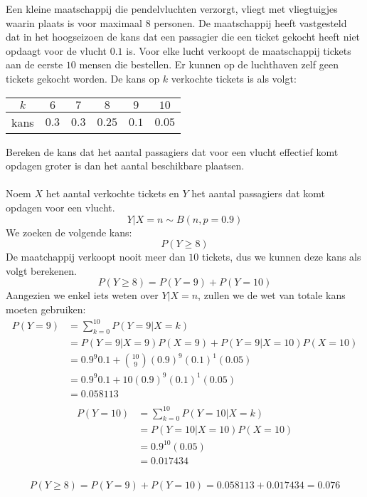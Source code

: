\documentclass[main.tex]{subfiles}
\begin{document}
\begin{oef}
  Een kleine maatschappij die pendelvluchten verzorgt, vliegt met vliegtuigjes waarin plaats is voor maximaal $8$ personen.
  De maatschappij heeft vastgesteld dat in het hoogseizoen de kans dat een passagier die een ticket gekocht heeft niet opdaagt voor de vlucht $0.1$ is.
  Voor elke lucht verkoopt de maatschappij tickets aan de eerste $10$ mensen die bestellen.
  Er kunnen op de luchthaven zelf geen tickets gekocht worden.
  De kans op $k$ verkochte tickets is als volgt:
  \begin{center}
    \begin{tabular}[H]{c|ccccc}
      $k$ & $6$ & $7$ & $8$ & $9$ & $10$\\
      \hline
      kans & $0.3$ & $0.3$ & $0.25$ & $0.1$ & $0.05$\\
    \end{tabular}
  \end{center}
  Bereken de kans dat het aantal passagiers dat voor een vlucht effectief komt opdagen groter is
dan het aantal beschikbare plaatsen.\\\\
  Noem $X$ het aantal verkochte tickets en $Y$ het aantal passagiers dat komt opdagen voor een vlucht.
  \[ Y|X=n \sim B(n,p=0.9) \]
  We zoeken de volgende kans:
  \[ P( Y \ge 8) \]
  De maatchappij verkoopt nooit meer dan $10$ tickets, dus we kunnen deze kans als volgt berekenen. 
  \[ P(Y \ge 8) = P(Y=9) + P(Y=10) \]
  Aangezien we enkel iets weten over $Y|X=n$, zullen we de wet van totale kans moeten gebruiken:
  \[
  \begin{array}{rl}
    P(Y = 9)
    &= \sum_{k=0}^{10}P(Y=9|X=k)\\
    &= P(Y=9|X=9)P(X=9) + P(Y=9|X=10)P(X=10)\\
    &= 0.9^{9}0.1 + \binom{10}{9}(0.9)^{9}(0.1)^{1}(0.05)\\
    &= 0.9^{9}0.1 + 10(0.9)^{9}(0.1)^{1}(0.05)\\
    &= 0.058113\\
  \end{array}
  \]
  \[
  \begin{array}{rl}
    P(Y = 10)
    &= \sum_{k=0}^{10}P(Y=10|X=k)\\
    &= P(Y=10|X=10)P(X=10)\\
    &= 0.9^{10}(0.05)\\
    &= 0.017434\\
  \end{array}
  \]
  
  \[ P(Y \ge 8) = P(Y=9) + P(Y=10) = 0.058113 + 0.017434 = 0.076 \]
\end{oef}
\end{document}
